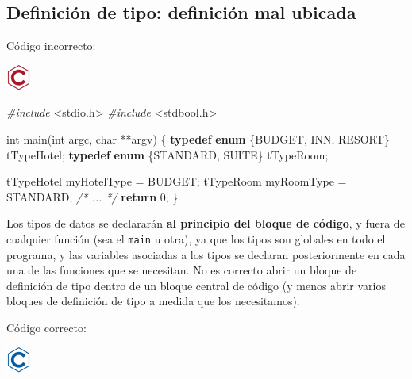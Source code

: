 \documentclass[
]{book}
\newenvironment{Shaded}{\begin{snugshade}}{\end{snugshade}}
\newcommand{\CommentTok}[1]{\textcolor[rgb]{0.56,0.35,0.01}{\textit{#1}}}
\newcommand{\ControlFlowTok}[1]{\textcolor[rgb]{0.13,0.29,0.53}{\textbf{#1}}}
\newcommand{\DataTypeTok}[1]{\textcolor[rgb]{0.13,0.29,0.53}{#1}}
\newcommand{\DecValTok}[1]{\textcolor[rgb]{0.00,0.00,0.81}{#1}}
\newcommand{\ImportTok}[1]{#1}
\newcommand{\KeywordTok}[1]{\textcolor[rgb]{0.13,0.29,0.53}{\textbf{#1}}}
\newcommand{\NormalTok}[1]{#1}
\newcommand{\PreprocessorTok}[1]{\textcolor[rgb]{0.56,0.35,0.01}{\textit{#1}}}
\begin{document}
\hypertarget{definiciuxf3n-de-tipo-definiciuxf3n-mal-ubicada}{%
\subsection{Definición de tipo: definición mal ubicada}\label{definiciuxf3n-de-tipo-definiciuxf3n-mal-ubicada}}

Código incorrecto:

\includegraphics{./img/c_err.png}

\begin{Shaded}
\begin{Highlighting}[]
\PreprocessorTok{\#include }\ImportTok{\textless{}stdio.h\textgreater{}}
\PreprocessorTok{\#include }\ImportTok{\textless{}stdbool.h\textgreater{}}

\DataTypeTok{int}\NormalTok{ main(}\DataTypeTok{int}\NormalTok{ argc, }\DataTypeTok{char}\NormalTok{ **argv) \{}
    \KeywordTok{typedef} \KeywordTok{enum}\NormalTok{ \{BUDGET, INN, RESORT\} tTypeHotel;}
    \KeywordTok{typedef} \KeywordTok{enum}\NormalTok{ \{STANDARD, SUITE\} tTypeRoom;}

\NormalTok{    tTypeHotel myHotelType = BUDGET;}
\NormalTok{    tTypeRoom myRoomType = STANDARD;}
    \CommentTok{/* ... */}
    \ControlFlowTok{return} \DecValTok{0}\NormalTok{;}
\NormalTok{\}}
\end{Highlighting}
\end{Shaded}

Los tipos de datos se declararán \textbf{al principio del bloque de código}, y fuera de cualquier función (sea el \texttt{main} u otra), ya que los tipos son globales en todo el programa, y las variables asociadas a los tipos se declaran posteriormente en cada una de las funciones que se necesitan. No es correcto abrir un bloque de definición de tipo dentro de un bloque central de código (y menos abrir varios bloques de definición de tipo a medida que los necesitamos).

Código correcto:

\includegraphics{./img/c.png}
\end{document}
